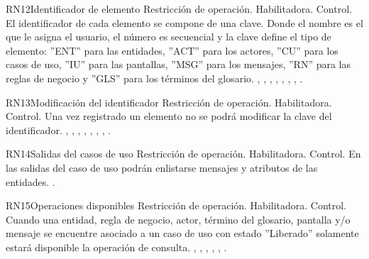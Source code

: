 \begin{BussinesRule}{RN12}{Identificador de elemento} 
	\BRitem[Tipo:] Restricción de operación. 
	\BRitem[Clase:] Habilitadora. 
	\BRitem[Nivel:] Control. %
	\BRitem[Descripción:] El identificador de cada elemento se compone de una clave. Donde el nombre es el que le asigna el usuario, el número es secuencial y la clave define el tipo de elemento: ''ENT'' para las entidades, ''ACT'' para los actores, ''CU'' para los casos de uso, ''IU'' para las pantallas, ''MSG'' para los mensajes, ''RN'' para las reglas de negocio y ''GLS'' para los términos del glosario.
	 , , , , , , , . 
\end{BussinesRule}

\begin{BussinesRule}{RN13}{Modificación del identificador} 
	\BRitem[Tipo:] Restricción de operación. 
	\BRitem[Clase:] Habilitadora. 
	\BRitem[Nivel:] Control. %
	\BRitem[Descripción:] Una vez registrado un elemento no se podrá modificar la clave del identificador.
	 , , , , , , , . 
\end{BussinesRule}

\begin{BussinesRule}{RN14}{Salidas del casos de uso} 
	\BRitem[Tipo:] Restricción de operación. 
	\BRitem[Clase:] Habilitadora. 
	\BRitem[Nivel:] Control. %
	\BRitem[Descripción:] En las salidas del caso de uso podrán enlistarse mensajes y atributos de las entidades.
	 \UCref{}{}. 
\end{BussinesRule}

\begin{BussinesRule}{RN15}{Operaciones disponibles} 
	\BRitem[Tipo:] Restricción de operación. 
	\BRitem[Clase:] Habilitadora. 
	\BRitem[Nivel:] Control. %
	\BRitem[Descripción:] Cuando una entidad, regla de negocio, actor, término del glosario, pantalla y/o mensaje se encuentre asociado a un caso de uso con estado ''Liberado'' solamente estará disponible la operación de consulta.
	 , , , , , . 
\end{BussinesRule}


